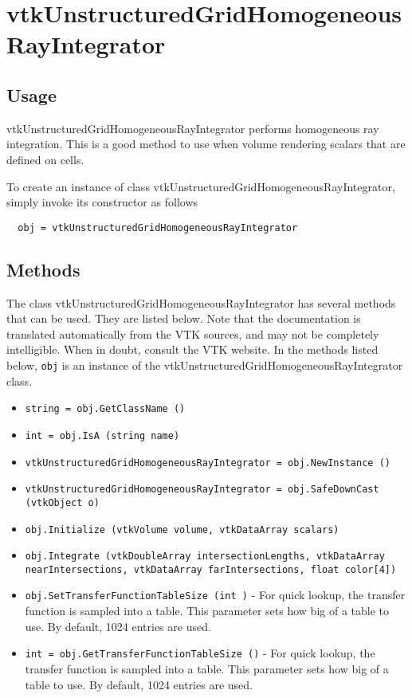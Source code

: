 \section{vtkUnstructuredGridHomogeneousRayIntegrator}

\subsection{Usage}


 vtkUnstructuredGridHomogeneousRayIntegrator performs homogeneous ray
 integration.  This is a good method to use when volume rendering scalars
 that are defined on cells.


To create an instance of class vtkUnstructuredGridHomogeneousRayIntegrator, simply
invoke its constructor as follows
\begin{verbatim}
  obj = vtkUnstructuredGridHomogeneousRayIntegrator
\end{verbatim}
\subsection{Methods}

The class vtkUnstructuredGridHomogeneousRayIntegrator has several methods that can be used.
  They are listed below.
Note that the documentation is translated automatically from the VTK sources,
and may not be completely intelligible.  When in doubt, consult the VTK website.
In the methods listed below, \verb|obj| is an instance of the vtkUnstructuredGridHomogeneousRayIntegrator class.
\begin{itemize}
\item  \verb|string = obj.GetClassName ()|

\item  \verb|int = obj.IsA (string name)|

\item  \verb|vtkUnstructuredGridHomogeneousRayIntegrator = obj.NewInstance ()|

\item  \verb|vtkUnstructuredGridHomogeneousRayIntegrator = obj.SafeDownCast (vtkObject o)|

\item  \verb|obj.Initialize (vtkVolume volume, vtkDataArray scalars)|

\item  \verb|obj.Integrate (vtkDoubleArray intersectionLengths, vtkDataArray nearIntersections, vtkDataArray farIntersections, float color[4])|

\item  \verb|obj.SetTransferFunctionTableSize (int )| -  For quick lookup, the transfer function is sampled into a table.
 This parameter sets how big of a table to use.  By default, 1024
 entries are used.

\item  \verb|int = obj.GetTransferFunctionTableSize ()| -  For quick lookup, the transfer function is sampled into a table.
 This parameter sets how big of a table to use.  By default, 1024
 entries are used.

\end{itemize}
